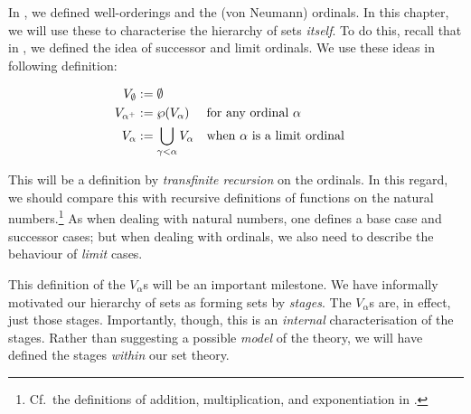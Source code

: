 \documentclass[../../../include/open-logic-section]{subfiles}
\begin{document}


In , we defined well-orderings and the
(von Neumann) ordinals. In this chapter, we will use these to
characterise the hierarchy of sets \emph{itself}. To do this, recall
that in , we defined the idea of
successor and limit ordinals. We use these ideas in following
definition:

\begin{defn}
	\begin{align*}
	V_\emptyset &:= \emptyset\\
	V_{\ordsucc{\alpha}} &:= \Pow{V_\alpha} & & 
	\text{for any ordinal }\alpha\\
	V_{\alpha} &:= \bigcup_{\gamma < \alpha} V_\alpha & & 
	\text{when }\alpha\text{ is a limit ordinal}
\end{align*}
\end{defn}

This will be a definition by \emph{transfinite recursion} on the
ordinals. In this regard, we should compare this with recursive
definitions of functions on the natural numbers.\footnote{Cf.\ the
definitions of addition, multiplication, and exponentiation in
.} As when dealing with natural
numbers, one defines a base case and successor cases; but when dealing
with ordinals, we also need to describe the behaviour of \emph{limit}
cases. 

This definition of the $V_\alpha$s will be an important milestone. We
have informally motivated our hierarchy of sets as forming sets by
\emph{stages}. The $V_\alpha$s are, in effect, just those stages.
Importantly, though, this is an \emph{internal} characterisation of
the stages. Rather than suggesting a possible \emph{model} of the
theory, we will have defined the stages \emph{within} our set theory.
\end{document}
